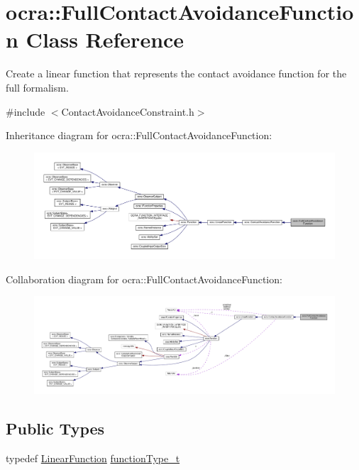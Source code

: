 \hypertarget{classocra_1_1FullContactAvoidanceFunction}{}\section{ocra\+:\+:Full\+Contact\+Avoidance\+Function Class Reference}
\label{classocra_1_1FullContactAvoidanceFunction}


Create a linear function that represents the contact avoidance function for the full formalism.  




{\ttfamily \#include $<$Contact\+Avoidance\+Constraint.\+h$>$}



Inheritance diagram for ocra\+:\+:Full\+Contact\+Avoidance\+Function\+:
\nopagebreak
\begin{figure}[H]
\begin{center}
\leavevmode
\includegraphics[width=350pt]{dc/d7e/classocra_1_1FullContactAvoidanceFunction__inherit__graph}
\end{center}
\end{figure}


Collaboration diagram for ocra\+:\+:Full\+Contact\+Avoidance\+Function\+:
\nopagebreak
\begin{figure}[H]
\begin{center}
\leavevmode
\includegraphics[width=350pt]{da/dbd/classocra_1_1FullContactAvoidanceFunction__coll__graph}
\end{center}
\end{figure}
\subsection*{Public Types}
\begin{DoxyCompactItemize}
\item 
typedef \hyperlink{classocra_1_1LinearFunction}{Linear\+Function} \hyperlink{classocra_1_1FullContactAvoidanceFunction_a9b59cb139be82095188084893d70b996}{function\+Type\+\_\+t}
\end{DoxyCompactItemize}
